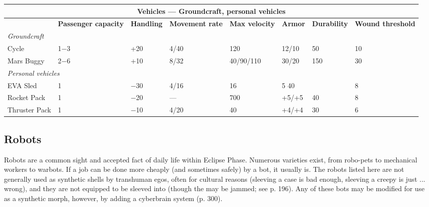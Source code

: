 \begin{table} \begin{tabularx}{\textwidth}{|l|X|X|X|X|X|X|X|} \hline

\multicolumn{8}{|c|}{\textbf{Vehicles --- Groundcraft, personal vehicles}} \\ \hline

&\textbf{Passenger capacity}	&\textbf{Handling}	&\textbf{Movement rate}	&\textbf{Max velocity}	&\textbf{Armor}	&\textbf{Durability}	&\textbf{Wound threshold} \\ \hline

\multicolumn{8}{|l|}{\emph{Groundcraft}} \\ \hline

Cycle	&1$-$3	&+20	&4/40	&120	&12/10	&50	&10 \\ \hline

Mars Buggy	&2$-$6	&+10	&8/32	&40/90/110	&30/20	&150	&30 \\ \hline

\multicolumn{8}{|l|}{\emph{Personal vehicles}} \\ \hline

EVA Sled	&1	&$-$30	&4/16	&16	&5 40	&&8 \\ \hline

Rocket Pack	&1	&$-$20	&--- &700	&+5/+5	&40	&8 \\ \hline

Thruster Pack	&1	&$-$10	&4/20	&40	&+4/+4	&30	&6 \\ \hline

\end{tabularx} \label{tab:groundcraft-personal} \end{table} 



\subsection{Robots} \label{sec:robots} 

Robots are a common sight and accepted fact of daily life within Eclipse Phase. Numerous varieties exist, from robo-pets to mechanical workers to warbots. If a job can be done more cheaply (and sometimes safely) by a bot, it usually is. The robots listed here are not generally used as synthetic shells by transhuman egos, often for cultural reasons (sleeving a case is bad enough, sleeving a creepy is just ... wrong), and they are not equipped to be sleeved into (though the may be jammed; see p. 196). Any of these bots may be modified for use as a synthetic morph, however, by adding a cyberbrain system (p. 300). 

